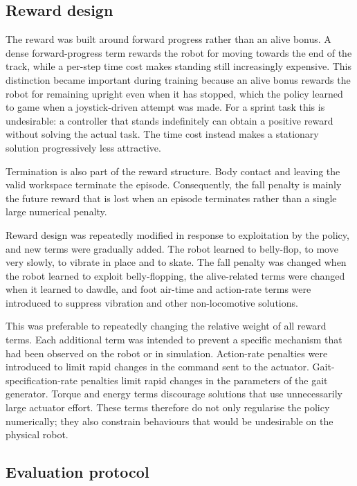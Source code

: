 \subsection{Reward design}

The reward was built around forward progress rather than an alive bonus.
A dense forward-progress term rewards the robot for moving towards the end of the track, while a per-step time cost makes standing still increasingly expensive.
This distinction became important during training because an alive bonus rewards the robot for remaining upright even when it has stopped, which the policy learned to game when a joystick-driven attempt was made.
For a sprint task this is undesirable: a controller that stands indefinitely can obtain a positive reward without solving the actual task.
The time cost instead makes a stationary solution progressively less attractive.

Termination is also part of the reward structure.
Body contact and leaving the valid workspace terminate the episode.
Consequently, the fall penalty is mainly the future reward that is lost when an episode terminates rather than a single large numerical penalty.

Reward design was repeatedly modified in response to exploitation by the policy, and new terms were gradually added.
The robot learned to belly-flop, to move very slowly, to vibrate in place and to skate.
The fall penalty was changed when the robot learned to exploit belly-flopping, the alive-related terms were changed when it learned to dawdle, and foot air-time and action-rate terms were introduced to suppress vibration and other non-locomotive solutions.

This was preferable to repeatedly changing the relative weight of all reward terms.
Each additional term was intended to prevent a specific mechanism that had been observed on the robot or in simulation.
Action-rate penalties were introduced to limit rapid changes in the command sent to the actuator.
Gait-specification-rate penalties limit rapid changes in the parameters of the gait generator.
Torque and energy terms discourage solutions that use unnecessarily large actuator effort.
These terms therefore do not only regularise the policy numerically; they also constrain behaviours that would be undesirable on the physical robot.

\subsection{Evaluation protocol}

